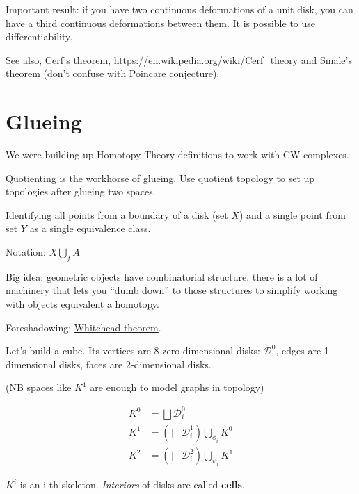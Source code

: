 \documentclass[10pt]{article}
\begin{document}
Important result: if you have two continuous deformations of a unit disk, you can have a third continuous deformations between them.
It is possible to use differentiability.

See also, Cerf's theorem, \url{https://en.wikipedia.org/wiki/Cerf_theory} and Smale's theorem (don't confuse with Poincare conjecture).

\section{Glueing}

We were building up Homotopy Theory definitions to work with CW complexes.


Quotienting is the workhorse of glueing. Use quotient topology to set up topologies after glueing two spaces.

\begin{example}
  Identifying all points from a boundary of a disk (set $X$) and a single point from set $Y$ as a single equivalence class.
\end{example}


Notation: $ X \bigcup_{f} A $

Big idea: geometric objects have combinatorial structure, there is a lot of machinery that lets you ``dumb down'' to those structures to simplify working with objects equivalent  a homotopy.

Foreshadowing: \href{https://en.wikipedia.org/wiki/Whitehead_theorem}{Whitehead theorem}.

\begin{example}
Let's build a cube.
Its vertices are 8 zero-dimensional disks: $\mathcal{D}^0$, edges are 1-dimensional disks, faces are 2-dimensional disks.

(NB spaces like $K^1$ are enough to model graphs in topology)

\begin{align*}
  K^0 &= \bigsqcup \mathcal{D}_i^0\\
  K^1 &= \left(\bigsqcup \mathcal{D}_i^1\right) \bigcup_{\phi_i} K^0\\
  K^2 &= \left(\bigsqcup \mathcal{D}_i^2\right) \bigcup_{\psi_i} K^1
\end{align*}

$K^i$ is an i-th skeleton. \textit{Interiors} of disks are called {\bf cells}.

\end{example}
\end{document}
